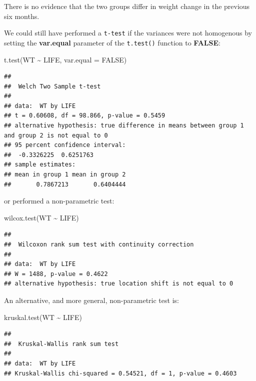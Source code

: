 \documentclass[
  12pt,
]{book}
\newenvironment{Shaded}{\begin{snugshade}}{\end{snugshade}}
\newcommand{\AttributeTok}[1]{\textcolor[rgb]{0.77,0.63,0.00}{#1}}
\newcommand{\ConstantTok}[1]{\textcolor[rgb]{0.00,0.00,0.00}{#1}}
\newcommand{\FunctionTok}[1]{\textcolor[rgb]{0.00,0.00,0.00}{#1}}
\newcommand{\NormalTok}[1]{#1}
\newcommand{\SpecialCharTok}[1]{\textcolor[rgb]{0.00,0.00,0.00}{#1}}
\begin{document}
There is no evidence that the two groups differ in weight change in the previous six months.

We could still have performed a \texttt{t-test} if the variances were not homogenous by setting the \textbf{var.equal} parameter of the \texttt{t.test()} function to \textbf{FALSE}:

\begin{Shaded}
\begin{Highlighting}[]
\FunctionTok{t.test}\NormalTok{(WT }\SpecialCharTok{\textasciitilde{}}\NormalTok{ LIFE, }\AttributeTok{var.equal =} \ConstantTok{FALSE}\NormalTok{)}
\end{Highlighting}
\end{Shaded}

\begin{verbatim}
## 
##  Welch Two Sample t-test
## 
## data:  WT by LIFE
## t = 0.60608, df = 98.866, p-value = 0.5459
## alternative hypothesis: true difference in means between group 1 and group 2 is not equal to 0
## 95 percent confidence interval:
##  -0.3326225  0.6251763
## sample estimates:
## mean in group 1 mean in group 2 
##       0.7867213       0.6404444
\end{verbatim}

or performed a non-parametric test:

\begin{Shaded}
\begin{Highlighting}[]
\FunctionTok{wilcox.test}\NormalTok{(WT }\SpecialCharTok{\textasciitilde{}}\NormalTok{ LIFE)}
\end{Highlighting}
\end{Shaded}

\begin{verbatim}
## 
##  Wilcoxon rank sum test with continuity correction
## 
## data:  WT by LIFE
## W = 1488, p-value = 0.4622
## alternative hypothesis: true location shift is not equal to 0
\end{verbatim}

\newpage

An alternative, and more general, non-parametric test is:

\begin{Shaded}
\begin{Highlighting}[]
\FunctionTok{kruskal.test}\NormalTok{(WT }\SpecialCharTok{\textasciitilde{}}\NormalTok{ LIFE)}
\end{Highlighting}
\end{Shaded}

\begin{verbatim}
## 
##  Kruskal-Wallis rank sum test
## 
## data:  WT by LIFE
## Kruskal-Wallis chi-squared = 0.54521, df = 1, p-value = 0.4603
\end{verbatim}
\end{document}
